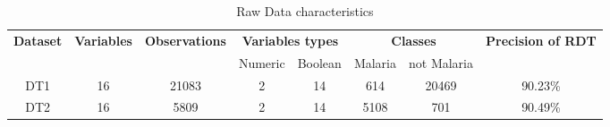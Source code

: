 \begin{table*}[!ht]
\centering
  \begin{tabular}{cccccccc}
    \toprule
    \multirow{2}{*}{\textbf{Dataset}} &
      \textbf{Variables}&\textbf{Observations}&
      \multicolumn{2}{c}{\textbf{Variables types}}& \multicolumn{2}{c}{\textbf{Classes}} & \textbf{Precision of RDT}\\
    & & & Numeric & Boolean & Malaria & not Malaria \\
    \midrule
    DT1 &16 & 21083  & 2 &  14& 614&20469 & 90.23\% \\
    DT2 & 16 & 5809 & 2 & 14 & 5108&701 & 90.49\% \\
    \bottomrule
  \end{tabular}
  \caption{Raw Data characteristics}\label{raw_data}
\end{table*}


